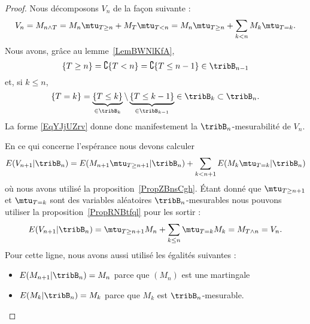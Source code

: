 \begin{proof}
	Nous décomposons \( V_n\) de la façon suivante :
	\begin{equation}    \label{EqYJjUZrv}
		V_n=M_{n\wedge T}=M_n\mtu_{T\geq n}+M_T\mtu_{T<n}=M_n\mtu_{T\geq n}+\sum_{k< n}M_k\mtu_{T=k}.
	\end{equation}
	Nous avons, grâce au lemme~\ref{LemBWNlKfA},
	\begin{equation}
		\{ T\geq n \}=\complement\{ T<n \}=\complement\{ T\leq n-1 \}\in\tribB_{n-1}
	\end{equation}
	et, si \( k\leq n\),
	\begin{equation}
		\{ T=k \}=\underbrace{\{ T\leq k \}}_{\in\tribB_k}\setminus\underbrace{\{ T\leq k-1 \}}_{\in\tribB_{k-1}}\in\tribB_k\subset\tribB_n.
	\end{equation}
	La forme \eqref{EqYJjUZrv} donne donc manifestement la \( \tribB_n\)-mesurabilité de \( V_n\).

	En ce qui concerne l'espérance nous devons calculer
	\begin{equation}
		E(V_{n+1}|\tribB_n)=E(M_{n+1}\mtu_{T\geq n+1}|\tribB_n)+\sum_{k<n+1}E(M_k\mtu_{T=k}|\tribB_n)
	\end{equation}
	où nous avons utilisé la proposition~\ref{PropZBnsCgh}. Étant donné que \( \mtu_{T\geq n+1}\) et \( \mtu_{T=k}\) sont des variables aléatoires \( \tribB_n\)-mesurables nous pouvons utiliser la proposition~\ref{PropRNBtfql} pour les sortir :
	\begin{equation}
		E(V_{n+1}|\tribB_n)=\mtu_{T\geq n+1}M_n+\sum_{k\leq n}\mtu_{T=k}M_k=M_{T\wedge n}=V_n.
	\end{equation}
	Pour cette ligne, nous avons aussi utilisé les égalités suivantes :
	\begin{itemize}
		\item
		      \( E(M_{n+1}|\tribB_n)=M_n\) parce que \( (M_n)\) est une martingale
		\item
		      \( E(M_k|\tribB_n)=M_k\) parce que \( M_k\) est \( \tribB_n\)-mesurable.
	\end{itemize}
\end{proof}

